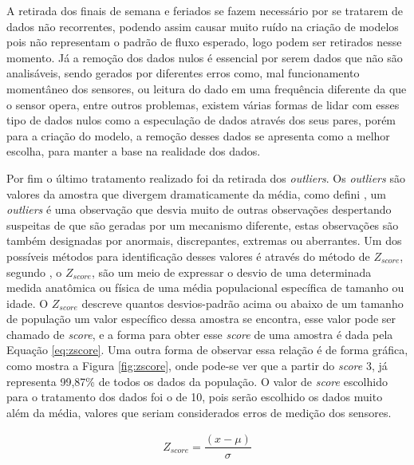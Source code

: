 \documentclass[acronym,symbols,table]{fei}
\begin{document}
A retirada dos finais de semana e feriados se fazem necessário por se tratarem de dados não recorrentes, podendo assim causar muito ruído na criação de modelos pois não representam o padrão de fluxo esperado, logo podem ser retirados nesse momento. Já a remoção dos dados nulos é essencial por serem dados que não são analisáveis, sendo gerados por diferentes erros como, mal funcionamento momentâneo dos sensores, ou leitura do dado em uma frequência diferente da que o sensor opera, entre outros problemas, existem várias formas de lidar com esses tipo de dados nulos como a especulação de dados através dos seus pares, porém para a criação do modelo, a remoção desses dados se apresenta como a melhor escolha, para manter a base na realidade dos dados. 

Por fim o último tratamento realizado foi da retirada dos \textit{outliers}. Os \textit{outliers} são valores da amostra que divergem dramaticamente da média, como defini \textcite{barnett1994outliers}, um \textit{outliers} é uma observação que desvia muito de outras observações despertando suspeitas de que são geradas por um mecanismo diferente, estas observações são também designadas por anormais, discrepantes, extremas ou aberrantes. Um dos possíveis métodos para identificação desses valores é através do método de \textit{${Z}_{score}$}, segundo \textcite{curtis2016mystery}, o \textit{${Z}_{score}$}, são um meio de expressar o desvio de uma determinada medida anatômica ou física de uma média populacional específica de tamanho ou idade. O \textit{${Z}_{score}$} descreve quantos desvios-padrão acima ou abaixo de um tamanho de população um valor específico dessa amostra se encontra, esse valor pode ser chamado de \textit{score}, e a forma para obter esse \textit{score} de uma amostra é dada pela Equação \ref{eq:zscore}. Uma outra forma de observar essa relação é de forma gráfica, como mostra a Figura \ref{fig:zscore}, onde pode-se ver que a partir do \textit{score} 3, já representa 99,87\% de todos os dados da população. O valor de \textit{score} escolhido para o tratamento dos dados foi o de 10, pois serão escolhido os dados muito além da média, valores que seriam considerados erros de medição dos sensores.   

\begin{equation} \label{eq:zscore}
    \begin{aligned}
    {Z}_{score}= \dfrac{({x} -{\mu})}{\sigma}
    \end{aligned}
\end{equation}
\end{document}
